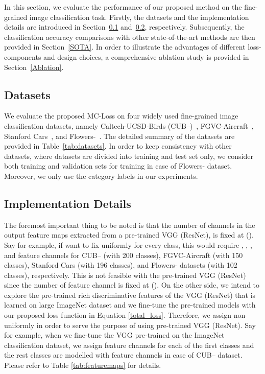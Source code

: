\documentclass[journal]{IEEEtran}
\begin{document}
In this section, we evaluate the performance of our proposed method on the fine-grained image classification task. Firstly, the datasets and the implementation details are introduced in Section~\ref{Datasets} and~\ref{Details}, respectively.  Subsequently, the classification accuracy comparisons with other state-of-the-art methods are then provided in Section~\ref{SOTA}. In order to illustrate the advantages of different loss-components and design choices, a comprehensive ablation study is provided in Section~\ref{Ablation}.    


\subsection{Datasets}\label{Datasets}

We evaluate the proposed MC-Loss on four widely used fine-grained image classification datasets, namely Caltech-UCSD-Birds (CUB--)~\cite{wah2011caltech}, FGVC-Aircraft~\cite{maji2013fine}, Stanford Cars~\cite{krause20133d}, and Flowers-~\cite{nilsback2008automated}. The detailed summary of the datasets are provided in Table~\ref{tab:datasets}. In order to keep consistency with other datasets, where datasets are divided into training and test set only, we consider both training and validation sets for training in case of Flowers- dataset. Moreover, we only use the category labels in our experiments.











\subsection{Implementation Details}\label{Details}

The foremost important thing to be noted is that the number of channels in the output feature maps extracted from a pre-trained VGG (ResNet), is fixed at  (). Say for example, if want to fix  uniformly for every class, this would require , , , and  feature channels for CUB-- (with 200 classes), FGVC-Aircraft (with 150 classes),  Stanford Cars (with 196 classes), and Flowers- datasets (with 102 classes), respectively. This is not feasible with the pre-trained VGG (ResNet) since the number of feature channel is fixed at   (). On the other side, we intend to explore the pre-trained rich discriminative features of the VGG (ResNet) that is learned on large ImageNet dataset and we fine-tune the pre-trained models with our proposed loss function in Equation \ref{total_loss}. Therefore, we assign  non-uniformly in order to serve the purpose of using pre-trained VGG  (ResNet). Say for example, when we fine-tune the VGG pre-trained on the ImageNet classification dataset, we assign  feature channels for each of the first  classes and the rest  classes are modelled with  feature channels in case of CUB-- dataset. Please refer to Table \ref{tab:featuremaps} for details. 
 
\end{document}
